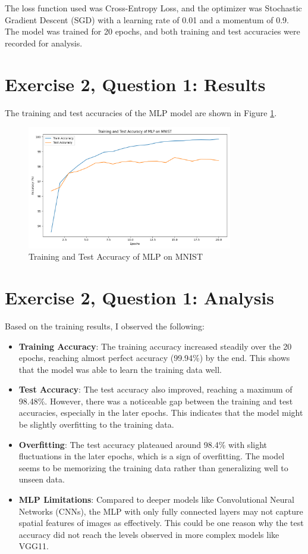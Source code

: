 \documentclass[10pt,letter,notitlepage]{article}
\begin{document}
\begin{center}
The loss function used was Cross-Entropy Loss, and the optimizer was Stochastic Gradient Descent (SGD) with a learning rate of 0.01 and a momentum of 0.9. The model was trained for 20 epochs, and both training and test accuracies were recorded for analysis.

\section{Exercise 2, Question 1: Results}
The training and test accuracies of the MLP model are shown in Figure \ref{fig:mlp_performance}.

\begin{figure}[h]
    \centering
    \includegraphics[width=0.8\textwidth]{mlp_performance.png}
    \caption{Training and Test Accuracy of MLP on MNIST}
    \label{fig:mlp_performance}
\end{figure}

\section{Exercise 2, Question 1: Analysis}
Based on the training results, I observed the following:
\begin{itemize}
    \item \textbf{Training Accuracy}: The training accuracy increased steadily over the 20 epochs, reaching almost perfect accuracy (99.94\%) by the end. This shows that the model was able to learn the training data well.
    \item \textbf{Test Accuracy}: The test accuracy also improved, reaching a maximum of 98.48\%. However, there was a noticeable gap between the training and test accuracies, especially in the later epochs. This indicates that the model might be slightly overfitting to the training data.
    \item \textbf{Overfitting}: The test accuracy plateaued around 98.4\% with slight fluctuations in the later epochs, which is a sign of overfitting. The model seems to be memorizing the training data rather than generalizing well to unseen data.
    \item \textbf{MLP Limitations}: Compared to deeper models like Convolutional Neural Networks (CNNs), the MLP with only fully connected layers may not capture spatial features of images as effectively. This could be one reason why the test accuracy did not reach the levels observed in more complex models like VGG11.
\end{itemize}


\end{center}
\end{document}
